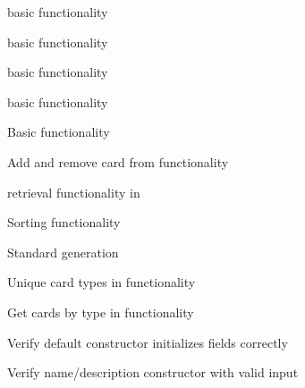 \begin{DoxyRefList}
\label{test__test000035}%
%
 basic functionality  



\label{test__test000040}%
%
 basic functionality  



\label{test__test000048}%
%
 basic functionality  



\label{test__test000053}%
%
 basic functionality  



\label{test__test000058}%
%
Basic  functionality  



\label{test__test000059}%
%
Add and remove card from  functionality  



\label{test__test000061}%
%
 retrieval functionality in   



\label{test__test000062}%
%
Sorting  functionality  



\label{test__test000063}%
%
Standard  generation  



\label{test__test000064}%
%
Unique card types in  functionality  



\label{test__test000065}%
%
Get cards by type in  functionality  



\label{test__test000068}%
%
Verify default constructor initializes fields correctly  



\label{test__test000069}%
%
Verify name/description constructor with valid input  




\end{DoxyRefList}
